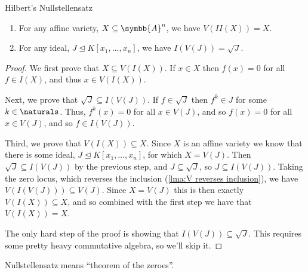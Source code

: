 \documentclass[fleqn]{NotesClass}
\newcommand{\subideal}{\trianglelefteq}
\newcommand{\affine}{\symbb{A}}
\begin{document}
    \begin{thm}{Hilbert's Nullstellensatz}{}
        \begin{enumerate}
            \item For any affine variety, \(X \subseteq \affine^n\), we have \(V(II(X)) = X\).
            \item For any ideal, \(J \subideal K[x_1, \dotsc, x_n]\), we have \(I(V(J)) = \sqrt{J}\).
        \end{enumerate}
        \begin{proof}
            We first prove that \(X \subseteq V(I(X))\).
            If \(x \in X\) then \(f(x) = 0\) for all \(f \in I(X)\), and thus \(x \in V(I(X))\).
            
            Next, we prove that \(\sqrt{J} \subseteq I(V(J))\).
            If \(f \in \sqrt{J}\) then \(f^k \in J\) for some \(k \in \naturals\).
            Thus, \(f^k(x) = 0\) for all \(x \in V(J)\), and so \(f(x) = 0\) for all \(x \in V(J)\), and so \(f \in I(V(J))\).
            
            Third, we prove that \(V(I(X)) \subseteq X\).
            Since \(X\) is an affine variety we know that there is some ideal, \(J \subideal K[x_1, \dotsc, x_n]\), for which \(X = V(J)\).
            Then \(\sqrt{J} \subseteq I(V(J))\) by the previous step, and \(J \subseteq \sqrt{J}\), so \(J \subseteq I(V(J))\).
            Taking the zero locus, which reverses the inclusion (\cref{lma:V reverses inclusion}), we have \(V(I(V(J))) \subseteq V(J)\).
            Since \(X = V(J)\) this is then exactly \(V(I(X)) \subseteq X\), and so combined with the first step we have that \(V(I(X)) = X\).
            
            The only hard step of the proof is showing that \(I(V(J)) \subseteq \sqrt{J}\).
            This requires some pretty heavy commutative algebra, so we'll skip it.
        \end{proof}
    \end{thm}
    
    \begin{remark}{}{}
        Nullstellensatz means \enquote{theorem of the zeroes}.
    \end{remark}
    
    
    \appendixpage
    \begin{appendices}
        
    \end{appendices}
    \backmatter
    \renewcommand{\glossaryname}{Acronyms}
    \printglossary[acronym]
    \printindex
\end{document}
